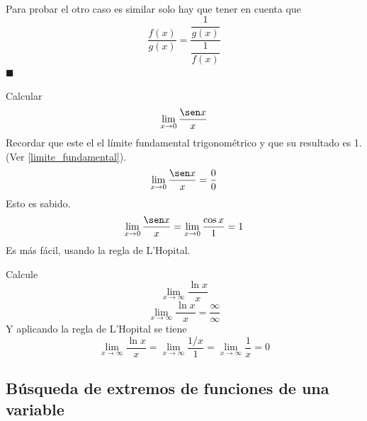 \documentclass[10pt,twoside]{SelfArx} %
\begin{document}
   \\
   Para probar el otro caso es similar solo hay que tener en cuenta que 
   \begin{equation}
   \dfrac{f(x)}{g(x)}=\dfrac{\dfrac{1}{g(x)}}{\dfrac{1}{f(x)}}
   \end{equation}
   $ \blacksquare $
   \begin{ejemplo}
   	Calcular\\
   	\begin{equation}
   	\lim\limits_{x\rightarrow0}\dfrac{\sen x}{x}
   	\end{equation}
   	Recordar que este el el l\'imite fundamental trigonom\'etrico y que su resultado es 1.(Ver \ref{limite_fundamental}).
   	\begin{equation}
   	\lim\limits_{x\rightarrow0}\dfrac{\sen x}{x}=\dfrac{0}{0}
   	\end{equation}
   	Esto es sabido.
   	\begin{equation}
   	\lim\limits_{x\rightarrow0}\dfrac{\sen x}{x}=\lim\limits_{x\rightarrow0}\dfrac{\cos x}{1}=1
   	\end{equation}
   	Es m\'as f\'acil, usando la regla de L'Hopital.
   \end{ejemplo}
   \begin{ejemplo}
   	Calcule\\
\[    	\lim\limits_{x\rightarrow\infty}\dfrac{\ln x}{x} \]
\begin{equation}
\lim\limits_{x\rightarrow\infty}\dfrac{\ln x}{x}=\dfrac{\infty}{\infty}
\end{equation}
Y aplicando la regla de L'Hopital se tiene
\begin{equation}
\lim\limits_{x\rightarrow\infty}\dfrac{\ln x}{x}=\lim\limits_{x\rightarrow\infty}\dfrac{1/x}{1}=\lim\limits_{x\rightarrow\infty}\dfrac{1}{x}=0
\end{equation}
   \end{ejemplo}
   
   
   
   
   
   
   
   
  \subsection{B\'usqueda de extremos de funciones de una variable}
  
\end{document}
